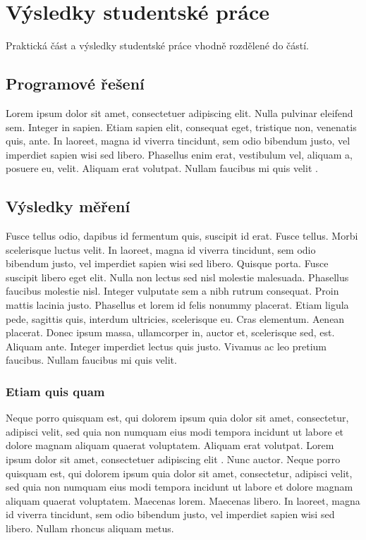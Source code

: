 \chapter{Výsledky studentské práce}

Praktická část a výsledky studentské práce vhodně rozdělené do částí.

\section{Programové řešení}
Lorem ipsum dolor sit amet, consectetuer adipiscing elit. Nulla pulvinar eleifend sem. Integer in sapien. Etiam sapien elit, consequat eget, tristique non, venenatis quis, ante. In laoreet, magna id viverra tincidunt, sem odio bibendum justo, vel imperdiet sapien wisi sed libero. Phasellus enim erat, vestibulum vel, aliquam a, posuere eu, velit. Aliquam erat volutpat. Nullam faucibus mi quis velit \cite{sr72/2017}.

\section{Výsledky měření}
Fusce tellus odio, dapibus id fermentum quis, suscipit id erat. Fusce tellus. Morbi scelerisque luctus velit. In laoreet, magna id viverra tincidunt, sem odio bibendum justo, vel imperdiet sapien wisi sed libero. Quisque porta. Fusce suscipit libero eget elit. Nulla non lectus sed nisl molestie malesuada. Phasellus faucibus molestie nisl. Integer vulputate sem a nibh rutrum consequat. Proin mattis lacinia justo. Phasellus et lorem id felis nonummy placerat. Etiam ligula pede, sagittis quis, interdum ultricies, scelerisque eu. Cras elementum. Aenean placerat. Donec ipsum massa, ullamcorper in, auctor et, scelerisque sed, est. Aliquam ante. Integer imperdiet lectus quis justo. Vivamus ac leo pretium faucibus. Nullam faucibus mi quis velit.

\subsection{Etiam quis quam}
Neque porro quisquam est, qui dolorem ipsum quia dolor sit amet, consectetur, adipisci velit, sed quia non numquam eius modi tempora incidunt ut labore et dolore magnam aliquam quaerat voluptatem. Aliquam erat volutpat. Lorem ipsum dolor sit amet, consectetuer adipiscing elit \cite{sr72/2017,pravidla}. Nunc auctor. Neque porro quisquam est, qui dolorem ipsum quia dolor sit amet, consectetur, adipisci velit, sed quia non numquam eius modi tempora incidunt ut labore et dolore magnam aliquam quaerat voluptatem. Maecenas lorem. Maecenas libero. In laoreet, magna id viverra tincidunt, sem odio bibendum justo, vel imperdiet sapien wisi sed libero. Nullam rhoncus aliquam metus.


